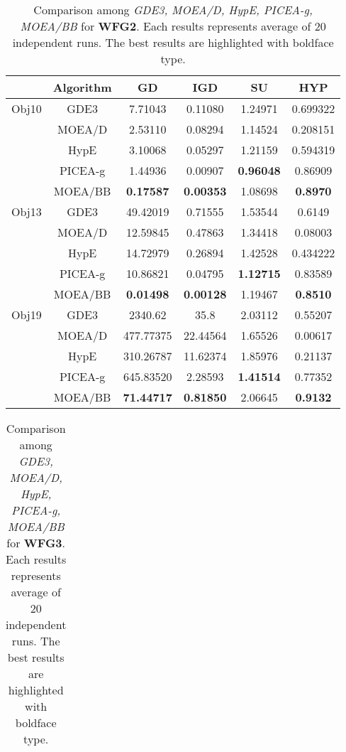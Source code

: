 \begin{center}
\begin{table}[!h]
\caption{Comparison among \textit{GDE3, MOEA/D, HypE, PICEA-g, MOEA/BB} for \textbf{WFG2}. Each results represents average of 20 independent runs. The best results are highlighted with boldface type.}
\begin{tabular}{| c | c | c | c | c | c |}

\hline
&\textbf{Algorithm}	&\textbf{GD}&\textbf{IGD}&\textbf{SU}&\textbf{HYP}\\\hline
Obj10	&GDE3		&7.71043			&0.11080			&1.24971			&0.699322\\\cline{2-6}
		&MOEA/D		&2.53110			&0.08294			&1.14524			&0.208151\\\cline{2-6}
		&HypE		&3.10068			&0.05297			&1.21159			&0.594319\\\cline{2-6}
		&PICEA-g	&1.44936			&0.00907			&\textbf{0.96048}	&0.86909\\\cline{2-6}
		&MOEA/BB	&\textbf{0.17587}	&\textbf{0.00353}	&1.08698			&\textbf{0.8970}\\\hline
		
Obj13	&GDE3		&49.42019			&0.71555			&1.53544			&0.6149\\\cline{2-6}
		&MOEA/D		&12.59845			&0.47863			&1.34418			&0.08003\\\cline{2-6}
		&HypE		&14.72979			&0.26894			&1.42528			&0.434222\\\cline{2-6}
		&PICEA-g	&10.86821			&0.04795			&\textbf{1.12715}			&0.83589\\\cline{2-6}
		&MOEA/BB	&\textbf{0.01498}	&\textbf{0.00128}	&1.19467	&\textbf{0.8510}\\\hline					
		
Obj19	&GDE3		&2340.62			&35.8				&2.03112			&0.55207\\\cline{2-6}
		&MOEA/D		&477.77375			&22.44564			&1.65526			&0.00617\\\cline{2-6}
		&HypE		&310.26787			&11.62374			&1.85976			&0.21137\\\cline{2-6}
		&PICEA-g	&645.83520			&2.28593			&\textbf{1.41514}	&0.77352\\\cline{2-6}
		&MOEA/BB	&\textbf{71.44717}	&\textbf{0.81850}	&2.06645			&\textbf{0.9132}\\

\hline
\end{tabular}
\label{tab:wfg2}
\end{table}
\begin{table}[!h]
\caption{Comparison among \textit{GDE3, MOEA/D, HypE, PICEA-g, MOEA/BB} for \textbf{WFG3}. Each results represents average of 20 independent runs. The best results are highlighted with boldface type.}
\begin{tabular}{| c | c | c | c | c | c |}


\end{tabular}
\end{table}
\end{center}
